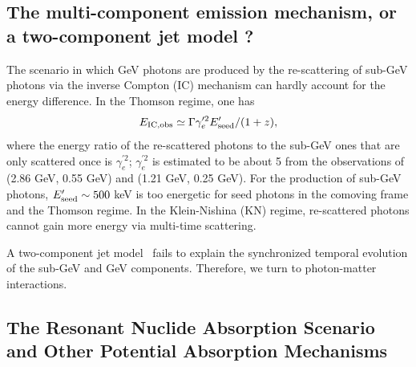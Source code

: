 \documentclass[linenumbers,twocolumn]{aastex631}
\begin{document}
 

\subsection{The multi-component emission mechanism, or a two-component jet model ?}\label{sec: multi}

 The scenario in which GeV photons are produced by the re-scattering of sub-GeV photons via the inverse Compton (IC) mechanism can hardly account for the energy difference. In the Thomson regime, one has
\begin{equation}
E_{\rm IC, obs}\simeq\Gamma\gamma'^{2}_e E'_{\rm seed}/(1+z),    
\end{equation}
 where the energy ratio of the re-scattered photons to the sub-GeV ones that are only scattered once is $\gamma_e^{'2}$; $\gamma_e^{'2}$ is estimated to be about 5 from the observations of (2.86 GeV, 0.55 GeV) and (1.21 GeV, 0.25 GeV). For the production of sub-GeV photons, $E'_{\rm seed}\sim 500$ keV is too energetic for seed photons in the comoving frame and the Thomson regime.
 In the Klein-Nishina (KN) regime, re-scattered photons cannot gain more energy via multi-time scattering. 

 A two-component jet model~\citep[a fast spine and slow sheath, e.g. see][]{2025ApJ...995L...2A} fails to explain the synchronized temporal evolution of the sub-GeV and GeV components. Therefore, we turn to photon-matter interactions.

 



 
 


\subsection{The Resonant Nuclide Absorption Scenario and Other Potential Absorption Mechanisms}
\label{sec:resonant-nuclide-absorption}\label{sec:absorption}
\end{document}
